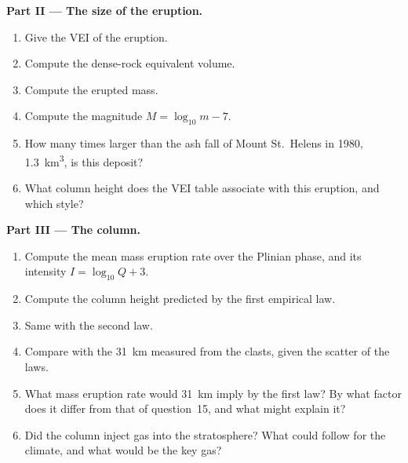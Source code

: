 \begin{problem}
\noindent\textbf{Part II --- The size of the eruption.}
\begin{enumerate}[resume]
\item Give the VEI of the eruption.
\item Compute the dense-rock equivalent volume.
\item Compute the erupted mass.
\item Compute the magnitude $M = \log_{10}m - 7$.
\item How many times larger than the ash fall of Mount St.~Helens in 1980,
\qty{1.3}{km^3}, is this deposit?
\item What column height does the VEI table associate with this eruption, and
which style?
\end{enumerate}

\noindent\textbf{Part III --- The column.}
\begin{enumerate}[resume]
\item Compute the mean mass eruption rate over the Plinian phase, and its
intensity $I = \log_{10}Q + 3$.
\item Compute the column height predicted by the first empirical law.
\item Same with the second law.
\item Compare with the \qty{31}{km} measured from the clasts, given the scatter
of the laws.
\item What mass eruption rate would \qty{31}{km} imply by the first law? By what
factor does it differ from that of question~15, and what might explain it?
\item Did the column inject gas into the stratosphere? What could follow for the
climate, and what would be the key gas?
\end{enumerate}


\end{problem}
